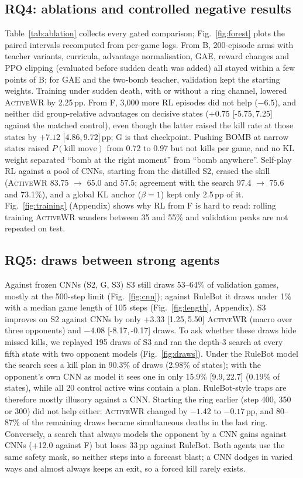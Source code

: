 \documentclass[conference]{IEEEtran}
\newcommand{\awr}{\textsc{ActiveWR}}
\newcommand{\pp}{\,pp}
\newcommand{\ci}[2]{[#1,\,#2]}
\begin{document}
\subsection{RQ4: ablations and controlled negative results}
\label{sec:rq4}
Table~\ref{tab:ablation} collects every gated comparison; Fig.~\ref{fig:forest} plots the paired intervals recomputed from per-game logs. From B, 200-episode arms with teacher variants, curricula, advantage normalisation, GAE, reward changes and PPO clipping (evaluated before sudden death was added) all stayed within a few points of B; for GAE and the two-bomb teacher, validation kept the starting weights. Training under sudden death, with or without a ring channel, lowered \awr{} by 2.25\pp{}. From F, 3{,}000 more RL episodes did not help ($-6.5$), and neither did group-relative advantages on decisive states ($+0.75$ \ci{-5.75}{7.25} against the matched control), even though the latter raised the kill rate at those states by $+7.12$ \ci{4.86}{9.72}\pp{}; G is that checkpoint. Pushing BOMB at narrow states raised $P(\text{kill move})$ from 0.72 to 0.97 but not kills per game, and no KL weight separated ``bomb at the right moment'' from ``bomb anywhere''. Self-play RL against a pool of CNNs, starting from the distilled S2, erased the skill (\awr{} 83.75 $\rightarrow$ 65.0 and 57.5; agreement with the search 97.4 $\rightarrow$ 75.6 and 73.1\%), and a global KL anchor ($\beta=1$) kept only 2.5\pp{} of it. Fig.~\ref{fig:training} (Appendix) shows why RL from F is hard to read: rolling training \awr{} wanders between 35 and 55\% and validation peaks are not repeated on test.

\subsection{RQ5: draws between strong agents}
\label{sec:rq5}
Against frozen CNNs (S2, G, S3) S3 still draws 53--64\% of validation games, mostly at the 500-step limit (Fig.~\ref{fig:cnn}); against RuleBot it draws under 1\% with a median game length of 105 steps (Fig.~\ref{fig:length}, Appendix). S3 improves on S2 against CNNs by only $+3.33$ \ci{1.25}{5.50} \awr{} (macro over three opponents) and $-4.08$ \ci{-8.17}{-0.17} draws. To ask whether these draws hide missed kills, we replayed 195 draws of S3 and ran the depth-3 search at every fifth state with two opponent models (Fig.~\ref{fig:draws}). Under the RuleBot model the search sees a kill plan in 90.3\% of draws (2.98\% of states); with the opponent's own CNN as model it sees one in only 15.9\% \ci{9.9}{22.7} (0.19\% of states), while all 20 control active wins contain a plan. RuleBot-style traps are therefore mostly illusory against a CNN. Starting the ring earlier (step 400, 350 or 300) did not help either: \awr{} changed by $-1.42$ to $-0.17$\pp{}, and 80--87\% of the remaining draws became simultaneous deaths in the last ring. Conversely, a search that always models the opponent by a CNN gains against CNNs (+12.0 against F) but loses 33\pp{} against RuleBot. Both agents use the same safety mask, so neither steps into a forecast blast; a CNN dodges in varied ways and almost always keeps an exit, so a forced kill rarely exists.
\end{document}
